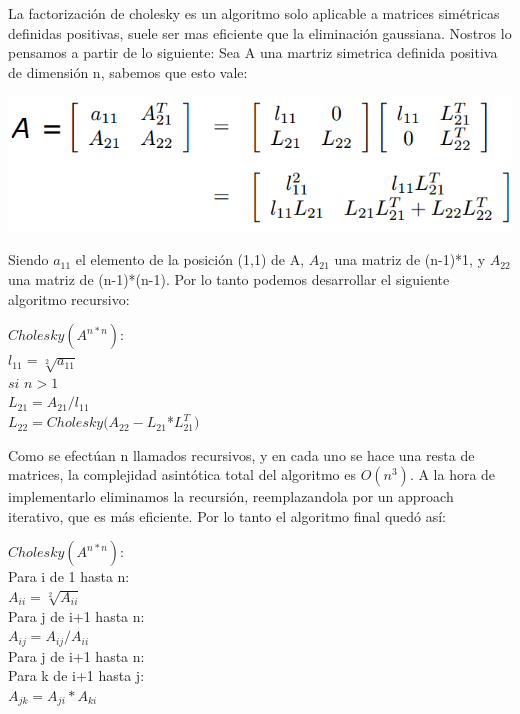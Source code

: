 La factorización de cholesky es un algoritmo solo aplicable a matrices simétricas definidas positivas, suele ser mas eficiente que la eliminación gaussiana. Nostros lo pensamos a partir de lo siguiente: Sea A una martriz simetrica definida positiva de dimensión n, sabemos que esto vale:

\includegraphics{img/chol.png}

Siendo $a_{11}$ el elemento de la posición (1,1) de A, $A_{21}$ una matriz de (n-1)*1, y $A_{22}$ una matriz de (n-1)*(n-1). Por lo tanto podemos desarrollar el siguiente algoritmo recursivo:

\begin{codesnippet}

    $Cholesky(A^{n*n})$:\\
    \tab $l_{11} =  \sqrt[2]{a_{11}}$ \\
    \tab $si$ $n > 1$ \\
    \tab \tab $L_{21} =  A_{21}/l_{11}$ \\
    \tab \tab $L_{22} =  Cholesky(A_{22}-L_{21}$*$L_{21}^{T})$ \\
\end{codesnippet}

Como se efectúan n llamados recursivos, y en cada uno se hace una resta de matrices, la complejidad asintótica total del algoritmo es $O(n^3)$. A la hora de implementarlo eliminamos la recursión, reemplazandola por un approach iterativo, que es más eficiente. Por lo tanto el algoritmo final quedó así:

\begin{codesnippet}
    $Cholesky(A^{n*n})$:\\
    \tab Para i de 1 hasta n: \\
    \tab \tab $A_{ii} = \sqrt[2]{A_{ii}}$ \\
    \tab \tab Para j de i+1 hasta n: \\
    \tab \tab \tab $A_{ij} = A_{ij}/A_{ii}$ \\
    \tab \tab Para j de i+1 hasta n: \\
    \tab \tab \tab Para k de i+1 hasta j: \\
    \tab \tab \tab \tab $A_{jk} = A_{ji}*A_{ki}$ \\
\end{codesnippet}

